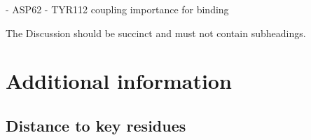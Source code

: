 \documentclass[fleqn,10pt]{wlscirep}
\begin{document}
  - ASP62 - TYR112 coupling importance for binding

The Discussion should be succinct and must not contain subheadings.



%





\section{Additional information}


\subsection{Distance to key residues}
\end{document}
